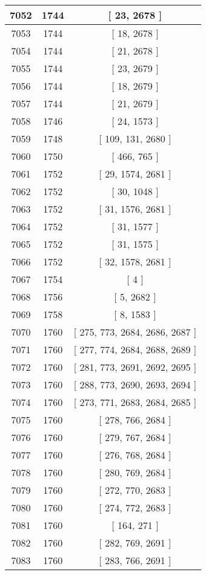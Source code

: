\begin{center}
\begin{longtable}[H]{|| c c c ||}
\hline
7052 & 1744 & [ 23, 2678 ] \\ 
\hline
7053 & 1744 & [ 18, 2678 ] \\ 
\hline
7054 & 1744 & [ 21, 2678 ] \\ 
\hline
7055 & 1744 & [ 23, 2679 ] \\ 
\hline
7056 & 1744 & [ 18, 2679 ] \\ 
\hline
7057 & 1744 & [ 21, 2679 ] \\ 
\hline
7058 & 1746 & [ 24, 1573 ] \\ 
\hline
7059 & 1748 & [ 109, 131, 2680 ] \\ 
\hline
7060 & 1750 & [ 466, 765 ] \\ 
\hline
7061 & 1752 & [ 29, 1574, 2681 ] \\ 
\hline
7062 & 1752 & [ 30, 1048 ] \\ 
\hline
7063 & 1752 & [ 31, 1576, 2681 ] \\ 
\hline
7064 & 1752 & [ 31, 1577 ] \\ 
\hline
7065 & 1752 & [ 31, 1575 ] \\ 
\hline
7066 & 1752 & [ 32, 1578, 2681 ] \\ 
\hline
7067 & 1754 & [ 4 ] \\ 
\hline
7068 & 1756 & [ 5, 2682 ] \\ 
\hline
7069 & 1758 & [ 8, 1583 ] \\ 
\hline
7070 & 1760 & [ 275, 773, 2684, 2686, 2687 ] \\ 
\hline
7071 & 1760 & [ 277, 774, 2684, 2688, 2689 ] \\ 
\hline
7072 & 1760 & [ 281, 773, 2691, 2692, 2695 ] \\ 
\hline
7073 & 1760 & [ 288, 773, 2690, 2693, 2694 ] \\ 
\hline
7074 & 1760 & [ 273, 771, 2683, 2684, 2685 ] \\ 
\hline
7075 & 1760 & [ 278, 766, 2684 ] \\ 
\hline
7076 & 1760 & [ 279, 767, 2684 ] \\ 
\hline
7077 & 1760 & [ 276, 768, 2684 ] \\ 
\hline
7078 & 1760 & [ 280, 769, 2684 ] \\ 
\hline
7079 & 1760 & [ 272, 770, 2683 ] \\ 
\hline
7080 & 1760 & [ 274, 772, 2683 ] \\ 
\hline
7081 & 1760 & [ 164, 271 ] \\ 
\hline
7082 & 1760 & [ 282, 769, 2691 ] \\ 
\hline
7083 & 1760 & [ 283, 766, 2691 ] \\ 

\end{longtable}
\end{center}
